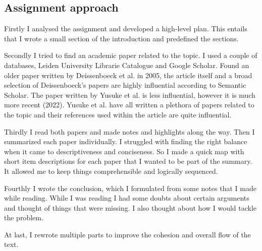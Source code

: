 \documentclass[a4paper,12pt]{article}
\begin{document}
\begin{multicols}{2}
\section*{Assignment approach}
Firstly I analysed the assignment and developed a high-level plan. This entails that I wrote a small section of the introduction and predefined the sections. 

Secondly I tried to find an academic paper related to the topic. I used a couple of databases, Leiden University Librarie Catalogue and Google Scholar. Found an older paper written by Deissenboeck et al. in 2005, the article itself and a broad selection of Deissenboeck's papers are highly influential according to Semantic Scholar. The paper written by Yusuke et al. is less influential, however it is much more recent (2022). Yusuke et al. have all written a plethora of papers related to the topic and their references used within the article are quite influential. 

Thirdly I read both papers and made notes and highlights along the way. Then I summarized each paper individually. I struggled with finding the right balance when it came to descriptiveness and conciseness. So I made a quick map with short item descriptions for each paper that I wanted to be part of the summary. It allowed me to keep things comprehensible and logically sequenced. 

Fourthly I wrote the conclusion, which I formulated from some notes that I made while reading. While I was reading I had some doubts about certain arguments and thought of things that were missing. I also thought about how I would tackle the problem.

At last, I rewrote multiple parts to improve the cohesion and overall flow of the text.

\end{multicols}

\printbibliography
\end{document}
